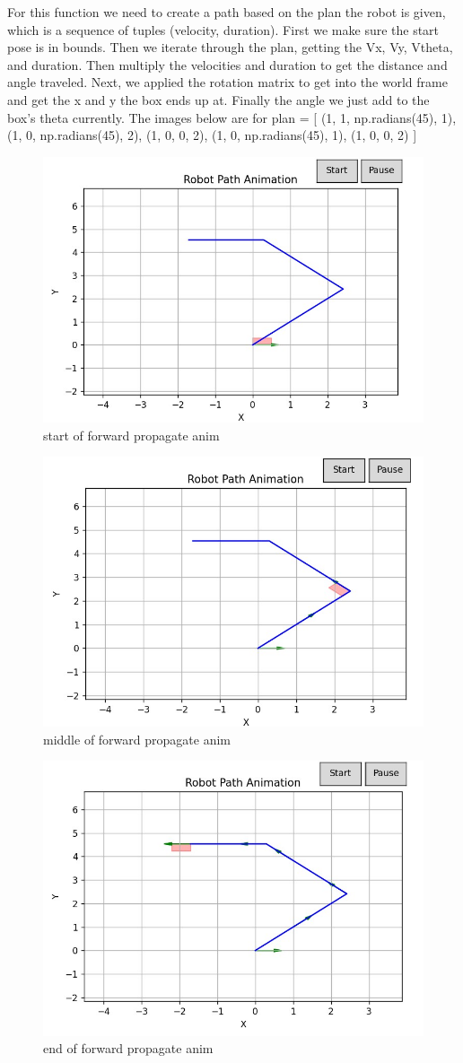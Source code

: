 \documentclass{article}
\begin{document}
For this function we need to create a path based on the plan the robot is given, which is a sequence of tuples (velocity, duration). First we make sure the start pose is in bounds. Then we iterate through the plan, getting the Vx, Vy, Vtheta, and duration. Then multiply the velocities and duration to get the distance and angle traveled. Next, we applied the rotation matrix to get into the world frame and get the x and y the box ends up at. Finally the angle we just add to the box's theta currently. The images below are for plan = [
     (1, 1, np.radians(45), 1), 
     (1, 0, np.radians(45), 2),   
     (1, 0, 0, 2),
     (1, 0, np.radians(45), 1),
     (1, 0, 0, 2)   
     ]

\begin{figure} [H]
    \centering
    \includegraphics[width=0.5\linewidth]{latex_media/start of forward propagate anim.jpg}
    \caption{start of forward propagate anim}
    \label{fig:6}
\end{figure}

\begin{figure} [H]
    \centering
    \includegraphics[width=0.5\linewidth]{latex_media/middle of forward propagate anim.jpg}
    \caption{middle of forward propagate anim}
    \label{fig:7}
\end{figure}

\begin{figure} [H]
    \centering
    \includegraphics[width=0.5\linewidth]{latex_media/end of forward propagate anim.jpg}
    \caption{end of forward propagate anim}
    \label{fig:8}
\end{figure}
\end{document}
